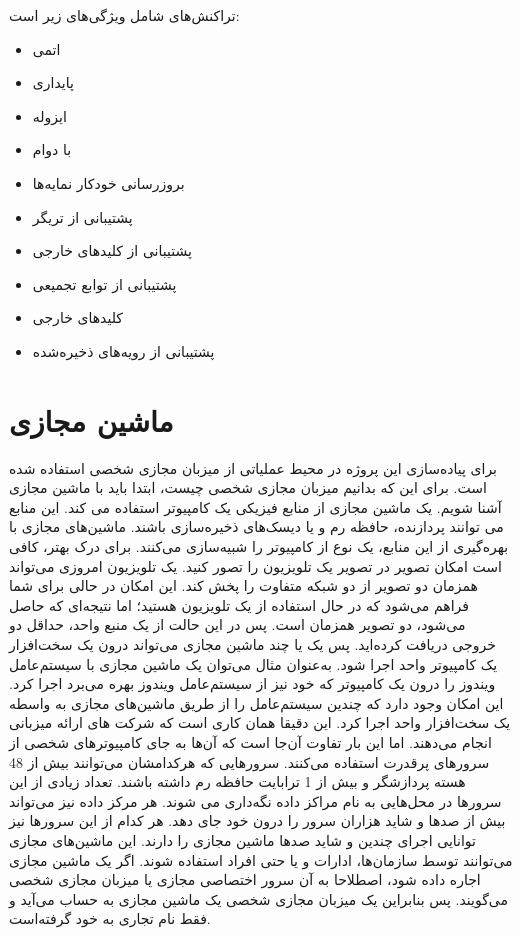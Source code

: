 {{تراکنش‌های  شامل ویژگی‌های زیر است:
\begin{itemize}
  	\item اتمی
	\item پایداری
	\item ایزوله
	\item با دوام
	\item بروزرسانی خودکار نمایه‌ها
	\item پشتیبانی از تریگر
	\item پشتیبانی از کلید‌های خارجی
	\item پشتیبانی از توابع تجمیعی
	\item کلید‌های خارجی
	\item پشتیبانی از رویه‌های ذخیره‌شده
\end{itemize}


\section{ماشین مجازی}
برای پیاده‌سازی این پروژه در محیط عملیاتی از میزبان مجازی شخصی استفاده شده است. برای این که بدانیم میزبان مجازی شخصی چیست، ابتدا باید با ماشین مجازی آشنا شویم. یک ماشین مجازی از منابع فیزیکی یک کامپیوتر استفاده می کند. این منابع می توانند پردازنده، حافظه رم و یا دیسک‌های ذخیره‌سازی باشند. ماشین‌های مجازی با بهره‌گیری از این منابع، یک نوع از کامپیوتر را شبیه‌سازی می‌کنند.
برای درک بهتر، کافی است امکان تصویر در تصویر یک تلویزیون را تصور کنید. یک تلویزیون امروزی می‌تواند همزمان دو تصویر از دو شبکه متفاوت را پخش کند. این امکان در حالی برای شما فراهم می‌شود که در حال استفاده از یک تلویزیون هستید؛ اما نتیجه‌ای که حاصل می‌شود، دو تصویر همزمان است. پس در این حالت از یک منبع واحد، حداقل دو خروجی دریافت کرده‌اید. پس یک یا چند ماشین‌ مجازی می‌تواند درون یک سخت‌افزار یک کامپیوتر واحد اجرا شود. به‌عنوان مثال می‌توان یک ماشین‌ مجازی با سیستم‌عامل ویندوز را درون یک کامپیوتر که خود نیز از سیستم‌عامل ویندوز بهره می‌برد اجرا کرد.
این امکان وجود دارد که چندین سیستم‌عامل را از طریق ماشین‌های مجازی به واسطه یک سخت‌افزار واحد اجرا کرد. این دقیقا همان کاری است که شرکت های ارائه میزبانی انجام می‌دهند. اما این بار تفاوت آن‌جا است که آن‌ها به جای کامپیوترهای شخصی از سرورهای پرقدرت استفاده می‌کنند. سرورهایی که هرکدامشان می‌توانند بیش از 48 هسته پردازشگر و بیش از 1 ترابایت حافظه رم داشته باشند. تعداد زیادی از این سرورها در محل‌هایی به نام مراکز داده نگه‌داری می شوند. هر مرکز داده نیز می‌تواند بیش از صدها و شاید هزاران سرور را درون خود جای دهد. هر کدام از این سرورها نیز توانایی اجرای چندین و شاید صدها ماشین مجازی را دارند.
این ماشین‌های مجازی می‌توانند توسط سازمان‌ها، ادارات و یا حتی افراد استفاده شوند. اگر یک ماشین مجازی اجاره داده شود، اصطلاحا به آن سرور اختصاصی مجازی یا میزبان مجازی شخصی می‌گویند. پس بنابراین یک میزبان مجازی شخصی یک ماشین مجازی به حساب می‌آید و فقط نام تجاری به خود گرفته‌است.
 
}}
